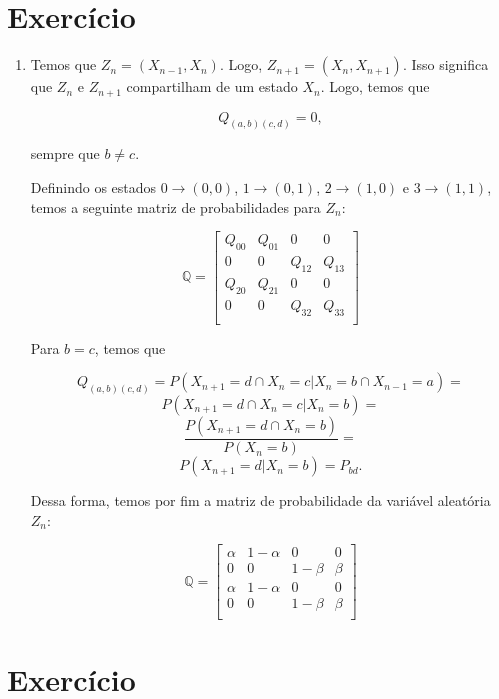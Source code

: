 \documentclass{article}
\begin{document}
\section{Exercício}

\begin{enumerate}
    \item[] Temos que $Z_n=(X_{n-1},X_n)$. Logo, $Z_{n+1}=(X_n,X_{n+1})$. Isso significa que $Z_n$ e $Z_{n+1}$ compartilham de um estado $X_n$. Logo, temos que
    
    $$Q_{(a,b)(c,d)}=0,$$
    
    sempre que $b\neq c$.
    
    Definindo os estados $0\rightarrow (0,0)$, $1\rightarrow (0,1)$, $2\rightarrow (1,0)$ e $3\rightarrow (1,1)$, temos a seguinte matriz de probabilidades para $Z_n$:
    
    $$\mathbb{Q}=\begin{bmatrix}
        Q_{00} & Q_{01} & 0 & 0\\
        0 & 0 & Q_{12} & Q_{13}\\
        Q_{20} & Q_{21} & 0 & 0\\
        0 & 0 & Q_{32} & Q_{33}\\
    \end{bmatrix}$$
    
    Para $b=c$, temos que
    
    $$Q_{(a,b)(c,d)}=P(X_{n+1}=d\cap X_n=c|X_n=b\cap X_{n-1}=a) =$$
    $$P(X_{n+1}=d\cap X_n=c|X_n=b) =$$
    $$\frac{P(X_{n+1}=d\cap X_n=b)}{P(X_n=b)} =$$
    $$P(X_{n+1}=d|X_n=b) = P_{bd}.$$
    
    \newpage
    
    Dessa forma, temos por fim a matriz de probabilidade da variável aleatória $Z_n$:
    
    $$\mathbb{Q}=\begin{bmatrix}
        \alpha & 1-\alpha & 0 & 0\\
        0 & 0 & 1-\beta & \beta\\
        \alpha & 1-\alpha & 0 & 0\\
        0 & 0 & 1-\beta & \beta\\
    \end{bmatrix}$$
    
\end{enumerate}

\section{Exercício}
\end{document}
